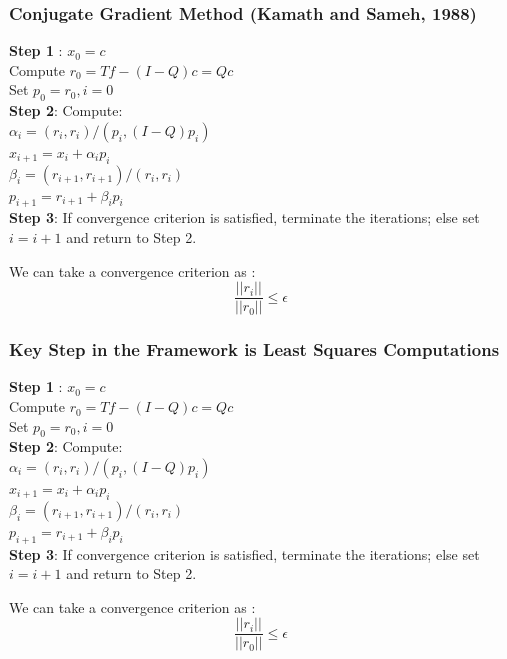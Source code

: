 \documentclass{beamer}
\begin{document}
\begin{frame}
\frametitle{Conjugate Gradient Method (Kamath and Sameh, 1988) }
\textbf{Step 1} : $x_0 = c$ \\
\hspace{.5in} Compute $r_0 = Tf - (I-Q)c = Qc$\\
\hspace{.5in} Set $p_0 = r_0, i = 0$ \\
\textbf{Step 2}:  Compute: \\
\hspace{.5in} $\alpha_i = (r_i, r_i)/(p_i, (I-Q)p_i)$ \\
\hspace{.5in} $ x_{i+1} = x_i + \alpha_i p_i $ \\
\hspace{.5in} $\beta_i = (r_{i+1}, r_{i+1})/(r_i, r_i) $ \\
\hspace{.5in} $p_{i+1} = r_{i+1} + \beta_i p _i $ \\
\textbf{Step 3}: If convergence criterion is satisfied, terminate the iterations; else set $i = i+1$ and return to Step 2.

\vspace{.4in}
 We can take a convergence criterion as : $$ \frac{ ||r_i||}{||r_0||} \leq \epsilon$$
\end{frame}


\begin{frame}
\frametitle{Key Step in the Framework is Least Squares Computations }
\textbf{Step 1} : $x_0 = c$ \\
\hspace{.5in} Compute $r_0 = Tf - \boxed{(I-Q)c} = Qc$\\
\hspace{.5in} Set $p_0 = r_0, i = 0$ \\
\textbf{Step 2}:  Compute: \\
\hspace{.5in} $\alpha_i = (r_i, r_i)/(p_i,\boxed{(I-Q)p_i})$ \\
\hspace{.5in} $ x_{i+1} = x_i + \alpha_i p_i $ \\
\hspace{.5in} $\beta_i = (r_{i+1}, r_{i+1})/(r_i, r_i) $ \\
\hspace{.5in} $p_{i+1} = r_{i+1} + \beta_i p _i $ \\
\textbf{Step 3}: If convergence criterion is satisfied, terminate the iterations; else set $i = i+1$ and return to Step 2.

\vspace{.4in}
 We can take a convergence criterion as : $$ \frac{ ||r_i||}{||r_0||} \leq \epsilon$$
\end{frame}
\end{document}
